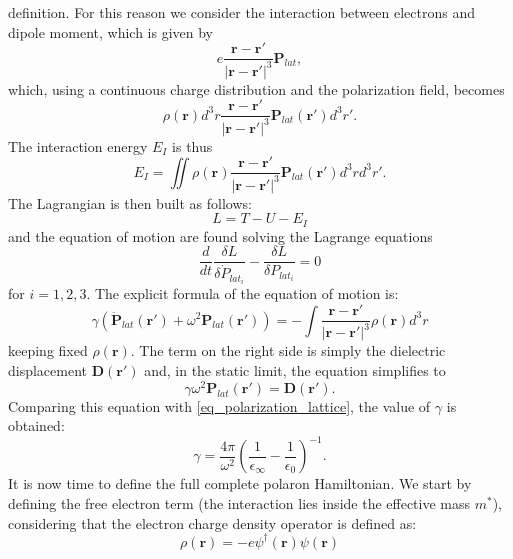 \documentclass[12pt, a4paper]{report}
\numberwithin{equation}{section}
\begin{document}
definition. For this reason we consider the interaction between electrons and dipole moment, which is given by 
\begin{equation}
    e\frac{\mathbf{r}-\mathbf{r}'}{|\mathbf{r}-\mathbf{r}'|^3}\mathbf{P}_{lat},
\end{equation}
which, using a continuous charge distribution and the polarization field, becomes
\begin{equation}
    \rho(\mathbf{r})d^3r\frac{\mathbf{r}-\mathbf{r}'}{|\mathbf{r}-\mathbf{r}'|^3}\mathbf{P}_{lat}(\mathbf{r}')d^3r'.
\end{equation}
The interaction energy $E_I$ is thus
\begin{equation}
    E_I=\iint \rho(\mathbf{r})\frac{\mathbf{r}-\mathbf{r}'}{|\mathbf{r}-\mathbf{r}'|^3}\mathbf{P}_{lat}(\mathbf{r}')d^3rd^3r'.
\end{equation}
The Lagrangian is then built as follows:
\begin{equation}
    L=T-U-E_I
\end{equation}
and the equation of motion are found solving the Lagrange equations
\begin{equation}
    \frac{d}{dt}\frac{\delta L}{\delta \dot{P}_{lat_i}}-\frac{\delta L}{\delta P_{lat_i}}=0
\end{equation}
for $i=1,2,3$. The explicit formula of the equation of motion is:
\begin{equation}
    \gamma(\ddot{\mathbf{P}}_{lat}(\mathbf{r}')+\omega^2\mathbf{P}_{lat}(\mathbf{r}'))=-\int \frac{\mathbf{r}-\mathbf{r}'}{|\mathbf{r}-\mathbf{r'}|^3}\rho(\mathbf{r})d^3r
\end{equation}
keeping fixed $\rho(\mathbf{r})$. The term on the right side is simply the dielectric displacement $\mathbf{D}(\mathbf{r}')$ and, in the 
static limit, the equation simplifies to
\begin{equation}
    \gamma\omega^2\mathbf{P}_{lat}(\mathbf{r}')=\mathbf{D}(\mathbf{r}').
\end{equation}
Comparing this equation with \ref{eq_polarization_lattice}, the value of $\gamma$ is obtained:
\begin{equation}
    \gamma = \frac{4\pi}{\omega^2}\left(\frac{1}{\epsilon_\infty}-\frac{1}{\epsilon_0}\right)^{-1}.
\end{equation}
It is now time to define the full complete polaron Hamiltonian. We start by defining the free electron term (the interaction lies inside 
the effective mass $m^*$), considering that the electron charge density operator is defined as:
\begin{equation}
    \rho(\mathbf{r})=-e\psi^\dagger(\mathbf{r})\psi(\mathbf{r})
\end{equation}
\end{document}
